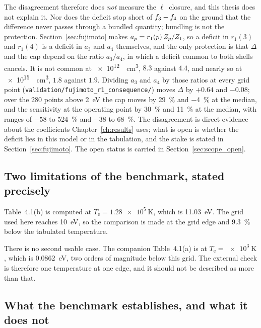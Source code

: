 The disagreement therefore does \emph{not} measure the $\ell$~closure, and this
thesis does not explain it. Nor does the deficit stop short of
$f_{3}-f_{4}$ on the ground that the difference never passes through a
bundled quantity; bundling is not the protection.
Section~\ref{sec:fujimoto} makes $a_p = r_1(p)\,Z_{p}/Z_{1}$, so a deficit
in $r_1(3)$ and $r_1(4)$ is a deficit in $a_3$ and $a_4$ themselves, and the
only protection is that $\Delta$ and the cap depend on the ratio $a_3/a_4$, in
which a deficit common to both shells cancels. It is not common at
\SI{e12}{\per\cubic\centi\metre}, $8.3$ against $4.4$, and nearly so at
\SI{e15}{\per\cubic\centi\metre}, $1.8$ against $1.9$. Dividing $a_3$ and
$a_4$ by those ratios at every grid point
(\texttt{validation/fujimoto\_r1\_consequence/}) moves $\Delta$ by $+0.64$ and
$-0.08$; over the $280$ points above \SI{2}{\electronvolt} the cap moves by
\SI{+29}{\percent} and \SI{-4}{\percent} at the median, and the sensitivity at
the operating point by \SI{+30}{\percent} and \SI{+11}{\percent} at the median,
with ranges of $-58$ to \SI{+524}{\percent} and $-38$ to \SI{+68}{\percent}.
The disagreement is direct evidence about the coefficients
Chapter~\ref{ch:results} uses; what is open is whether the deficit lies in this
model or in the tabulation, and the stake is stated in
Section~\ref{sec:fujimoto}. The open status is carried in
Section~\ref{sec:scope_open}.

\subsection{Two limitations of the benchmark, stated precisely}

Table~4.1(b) is computed at $T_\mathrm{e} = \SI{1.28e5}{\kelvin}$, which is
\SI{11.03}{\electronvolt}. The grid used here reaches \SI{10}{\electronvolt},
so the comparison is made at the grid edge and \SI{9.3}{\percent} below the
tabulated temperature.

There is no second usable case. The companion Table~4.1(a) is at
$T_\mathrm{e} = \SI{e3}{\kelvin}$, which is \SI{0.0862}{\electronvolt}, two
orders of magnitude below this grid. The external check is therefore one
temperature at one edge, and it should not be described as more than that.

\subsection{What the benchmark establishes, and what it does not}

